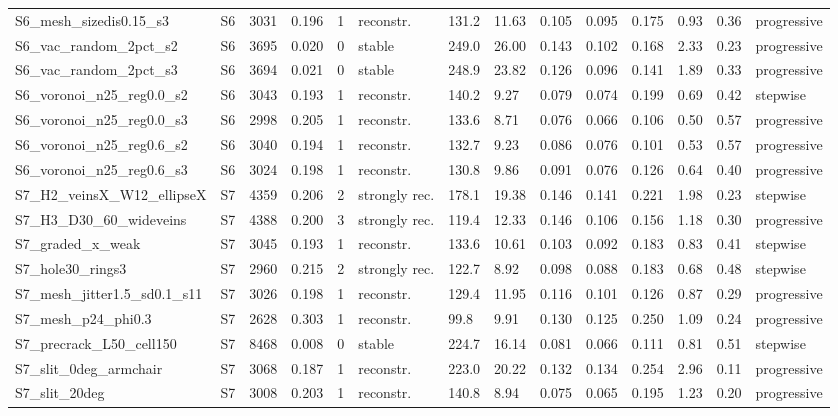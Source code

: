 \begin{landscape}
\begin{longtable}{llllllllllllll}
S6\_mesh\_sizedis0.15\_s3 & S6 & 3031 & 0.196 & 1 & reconstr. & 131.2 & 11.63 & 0.105 & 0.095 & 0.175 & 0.93 & 0.36 & progressive\\
S6\_vac\_random\_2pct\_s2 & S6 & 3695 & 0.020 & 0 & stable & 249.0 & 26.00 & 0.143 & 0.102 & 0.168 & 2.33 & 0.23 & progressive\\
S6\_vac\_random\_2pct\_s3 & S6 & 3694 & 0.021 & 0 & stable & 248.9 & 23.82 & 0.126 & 0.096 & 0.141 & 1.89 & 0.33 & progressive\\
S6\_voronoi\_n25\_reg0.0\_s2 & S6 & 3043 & 0.193 & 1 & reconstr. & 140.2 & 9.27 & 0.079 & 0.074 & 0.199 & 0.69 & 0.42 & stepwise\\
S6\_voronoi\_n25\_reg0.0\_s3 & S6 & 2998 & 0.205 & 1 & reconstr. & 133.6 & 8.71 & 0.076 & 0.066 & 0.106 & 0.50 & 0.57 & progressive\\
S6\_voronoi\_n25\_reg0.6\_s2 & S6 & 3040 & 0.194 & 1 & reconstr. & 132.7 & 9.23 & 0.086 & 0.076 & 0.101 & 0.53 & 0.57 & progressive\\
S6\_voronoi\_n25\_reg0.6\_s3 & S6 & 3024 & 0.198 & 1 & reconstr. & 130.8 & 9.86 & 0.091 & 0.076 & 0.126 & 0.64 & 0.40 & progressive\\
S7\_H2\_veinsX\_W12\_ellipseX & S7 & 4359 & 0.206 & 2 & strongly rec. & 178.1 & 19.38 & 0.146 & 0.141 & 0.221 & 1.98 & 0.23 & stepwise\\
S7\_H3\_D30\_60\_wideveins & S7 & 4388 & 0.200 & 3 & strongly rec. & 119.4 & 12.33 & 0.146 & 0.106 & 0.156 & 1.18 & 0.30 & progressive\\
S7\_graded\_x\_weak & S7 & 3045 & 0.193 & 1 & reconstr. & 133.6 & 10.61 & 0.103 & 0.092 & 0.183 & 0.83 & 0.41 & stepwise\\
S7\_hole30\_rings3 & S7 & 2960 & 0.215 & 2 & strongly rec. & 122.7 & 8.92 & 0.098 & 0.088 & 0.183 & 0.68 & 0.48 & stepwise\\
S7\_mesh\_jitter1.5\_sd0.1\_s11 & S7 & 3026 & 0.198 & 1 & reconstr. & 129.4 & 11.95 & 0.116 & 0.101 & 0.126 & 0.87 & 0.29 & progressive\\
S7\_mesh\_p24\_phi0.3 & S7 & 2628 & 0.303 & 1 & reconstr. & 99.8 & 9.91 & 0.130 & 0.125 & 0.250 & 1.09 & 0.24 & progressive\\
S7\_precrack\_L50\_cell150 & S7 & 8468 & 0.008 & 0 & stable & 224.7 & 16.14 & 0.081 & 0.066 & 0.111 & 0.81 & 0.51 & stepwise\\
S7\_slit\_0deg\_armchair & S7 & 3068 & 0.187 & 1 & reconstr. & 223.0 & 20.22 & 0.132 & 0.134 & 0.254 & 2.96 & 0.11 & progressive\\
S7\_slit\_20deg & S7 & 3008 & 0.203 & 1 & reconstr. & 140.8 & 8.94 & 0.075 & 0.065 & 0.195 & 1.23 & 0.20 & progressive\\

\end{longtable}
\end{landscape}
